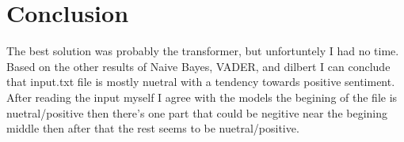 \documentclass[12pt]{article}
\begin{document}
\section{Conclusion}
The best solution was probably the transformer, but unfortuntely I had no time. Based on the other results of Naive Bayes, VADER, and dilbert
I can conclude that input.txt file is mostly nuetral with a tendency towards positive sentiment. After reading the input myself I agree with
the models the begining of the file is nuetral/positive then there's one part that could be negitive near the begining middle then after that
the rest seems to be nuetral/positive.

\newpage
{}

\end{document}
